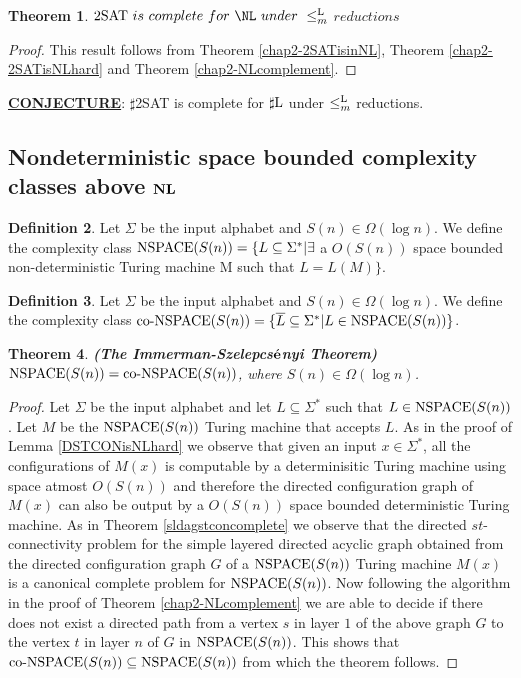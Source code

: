\documentclass{amsbook}
\newtheorem{theorem}{Theorem}[chapter]
\theoremstyle{definition}
\newtheorem{definition}[theorem]{Definition}
\theoremstyle{remark}
\numberwithin{section}{chapter}
\numberwithin{equation}{chapter}
\renewcommand{\NSPACE}{\mbox{\rm NSPACE}}
\newcommand{\coNSPACE}{\mbox{\rm co-NSPACE}}
\newcommand{\Lredn}{\leq^{\small{\rm L}}_m}
\newcommand{\boldNL}{\mbox{\rm \bf NL}}
\newcommand{\sharpL}{\mbox{$\sharp$\rm L}}
\begin{document}
\begin{theorem}
{${\rm 2SAT}~{is~complete~for~\NL}~{under~\Lredn}~$${reductions}$}
\end{theorem}
\begin{proof}
This result follows from Theorem \ref{chap2-2SATisinNL}, Theorem \ref{chap2-2SATisNLhard} and Theorem \ref{chap2-NLcomplement}.
\end{proof}

{\bf\underline{CONJECTURE}}: $\sharp$2SAT is complete for $\sharpL$ under $\Lredn$ reductions.

\subsection{Nondeterministic space bounded complexity classes above $\boldNL$}
\begin{definition}
Let $\Sigma$ be the input alphabet and $S(n)\in\Omega (\log n)$. We define the complexity class $\NSPACE (S(n))=\{ L\subseteq \Sigma^*|\exists$ a $O(S(n))$ space bounded non-deterministic Turing machine M such that $L=L(M)\}$.
\end{definition}

\begin{definition}
Let $\Sigma$ be the input alphabet and $S(n)\in\Omega (\log n)$. We define the complexity class $\coNSPACE (S(n))=\{ \overline{L}\subseteq \Sigma^*|L\in\NSPACE (S(n))\}$.
\end{definition}

\begin{theorem}
{\rm \bf(The Immerman-Szelepcs$\acute{\rm\bf e}$nyi Theorem)} $\NSPACE(S(n))=\coNSPACE (S(n))$, where $S(n)\in\Omega(\log n)$.
\end{theorem}
\begin{proof}
Let $\Sigma$ be the input alphabet and let $L\subseteq \Sigma^*$ such that $L\in\NSPACE (S(n))$. Let $M$ be the $\NSPACE(S(n))$ Turing machine that accepts $L$. As in the proof of Lemma \ref{DSTCONisNLhard} we observe that given an input $x\in\Sigma^*$, all the configurations of $M(x)$ is computable by a determinisitic Turing machine using space atmost $O(S(n))$ and therefore the directed configuration graph of $M(x)$ can also be output by a $O(S(n))$ space bounded deterministic Turing machine. As in Theorem \ref{sldagstconcomplete} we observe that the directed $st$-connectivity problem for the simple layered directed acyclic graph obtained from the directed configuration graph $G$ of a $\NSPACE (S(n))$ Turing machine $M(x)$ is a canonical complete problem for $\NSPACE (S(n))$. Now following the algorithm in the proof of Theorem \ref{chap2-NLcomplement} we are able to decide if there does not exist a directed path from a vertex $s$ in layer $1$ of the above graph $G$ to the vertex $t$ in layer $n$ of $G$ in $\NSPACE (S(n))$. This shows that $\coNSPACE (S(n))\subseteq \NSPACE (S(n))$ from which the theorem follows.
\end{proof}
\end{document}
